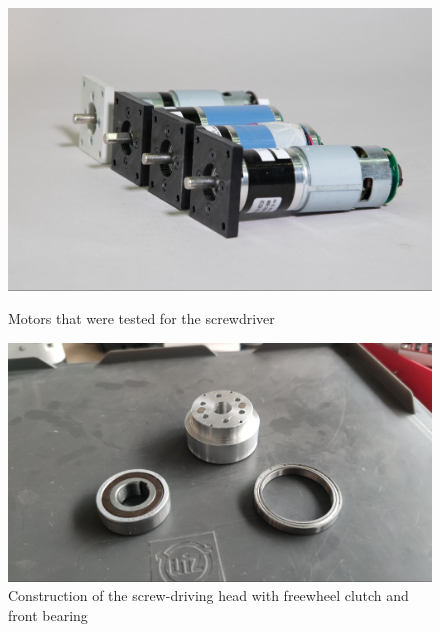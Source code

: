 \begin{figure}[!h]
    \centering
    \begin{minipage}{0.49\textwidth}
        \centering
        \includegraphics[width=\textwidth]{images/7a/img36.jpg}
        \caption{Motors that were tested for the screwdriver}
        \label{fig:motors-that-were-tested}
    \end{minipage}
    \hfill
    \begin{minipage}{0.49\textwidth}
        \centering
        \includegraphics[width=\textwidth]{images/7a/img37.jpg}
        \caption{Construction of the screw-driving head with freewheel clutch and front bearing}
        \label{fig:construction-of-the-screw-driving-head}
    \end{minipage}
\end{figure}

